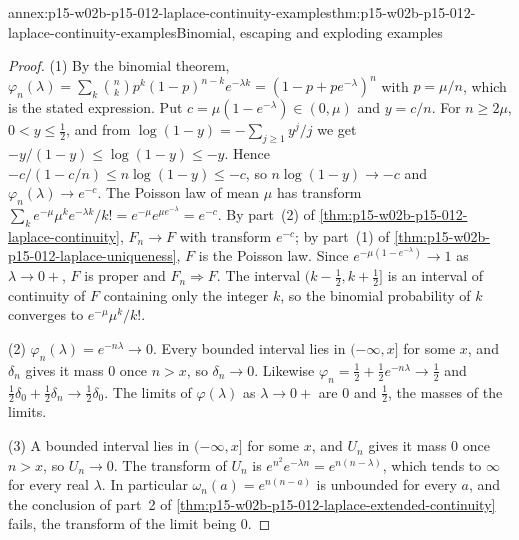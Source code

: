 \begin{annexitem}{annex:p15-w02b-p15-012-laplace-continuity-examples}{thm:p15-w02b-p15-012-laplace-continuity-examples}{Binomial, escaping and exploding examples}
\begin{proof}
(1) By the binomial theorem,
\(\varphi_n(\lambda)=\sum_k\binom nk p^k(1-p)^{n-k}e^{-\lambda k}=(1-p+pe^{-\lambda})^n\)
with \(p=\mu/n\), which is the stated expression. Put
\(c=\mu(1-e^{-\lambda})\in(0,\mu)\) and \(y=c/n\). For \(n\geq2\mu\),
\(0<y\leq\frac12\), and from \(\log(1-y)=-\sum_{j\geq1}y^j/j\) we get
\(-y/(1-y)\leq\log(1-y)\leq-y\). Hence
\(-c/(1-c/n)\leq n\log(1-y)\leq-c\), so \(n\log(1-y)\to-c\) and
\(\varphi_n(\lambda)\to e^{-c}\). The Poisson law of mean \(\mu\) has transform
\(\sum_ke^{-\mu}\mu^ke^{-\lambda k}/k!=e^{-\mu}e^{\mu e^{-\lambda}}=e^{-c}\).
By part~(2) of \cref{thm:p15-w02b-p15-012-laplace-continuity}, \(F_n\to F\)
with transform \(e^{-c}\); by part~(1) of
\cref{thm:p15-w02b-p15-012-laplace-uniqueness}, \(F\) is the Poisson law.
Since \(e^{-\mu(1-e^{-\lambda})}\to1\) as \(\lambda\to0+\), \(F\) is proper and
\(F_n\Rightarrow F\). The interval \((k-\frac12,k+\frac12]\) is an interval of
continuity of \(F\) containing only the integer \(k\), so the binomial
probability of \(k\) converges to \(e^{-\mu}\mu^k/k!\).

(2) \(\varphi_n(\lambda)=e^{-n\lambda}\to0\). Every bounded interval lies in
\((-\infty,x]\) for some \(x\), and \(\delta_n\) gives it mass \(0\) once
\(n>x\), so \(\delta_n\to0\). Likewise
\(\varphi_n=\frac12+\frac12e^{-n\lambda}\to\frac12\) and
\(\frac12\delta_0+\frac12\delta_n\to\frac12\delta_0\). The limits of
\(\varphi(\lambda)\) as \(\lambda\to0+\) are \(0\) and \(\frac12\), the
masses of the limits.

(3) A bounded interval lies in \((-\infty,x]\) for some \(x\), and
\(U_n\) gives it mass \(0\) once \(n>x\), so \(U_n\to0\). The transform of
\(U_n\) is \(e^{n^2}e^{-\lambda n}=e^{n(n-\lambda)}\), which tends to
\(\infty\) for every real \(\lambda\). In particular
\(\omega_n(a)=e^{n(n-a)}\) is unbounded for every \(a\), and the conclusion of
part~2 of \cref{thm:p15-w02b-p15-012-laplace-extended-continuity} fails, the
transform of the limit being \(0\).
\end{proof}
\end{annexitem}

